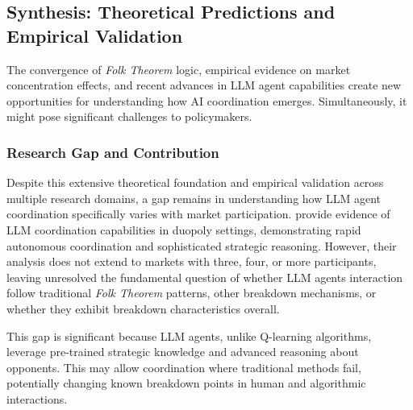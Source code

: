 

\subsection{Synthesis: Theoretical Predictions and Empirical Validation}

The convergence of \emph{Folk Theorem} logic, empirical evidence on market concentration effects, and recent advances in LLM agent capabilities create new opportunities for understanding how AI coordination emerges. Simultaneously, it might pose significant challenges to policymakers.

\subsubsection*{Research Gap and Contribution}

Despite this extensive theoretical foundation and empirical validation across multiple research domains, a gap remains in understanding how LLM agent coordination specifically varies with market participation. \textcite{fish_algorithmic_2025, lin_strategic_2025} provide evidence of LLM coordination capabilities in duopoly settings, demonstrating rapid autonomous coordination and sophisticated strategic reasoning. However, their analysis does not extend to markets with three, four, or more participants, leaving unresolved the fundamental question of whether LLM agents interaction follow traditional \emph{Folk Theorem} patterns, other breakdown mechanisms, or whether they exhibit breakdown characteristics overall.

This gap is significant because LLM agents, unlike Q-learning algorithms, leverage pre-trained strategic knowledge and advanced reasoning about opponents. This may allow coordination where traditional methods fail, potentially changing known breakdown points in human and algorithmic interactions.

